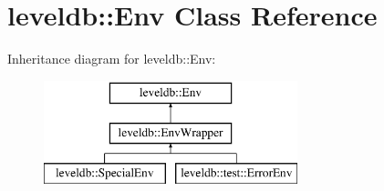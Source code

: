 \hypertarget{classleveldb_1_1_env}{}\section{leveldb\+:\+:Env Class Reference}
\label{classleveldb_1_1_env}
Inheritance diagram for leveldb\+:\+:Env\+:\begin{figure}[H]
\begin{center}
\leavevmode
\includegraphics[height=3.000000cm]{classleveldb_1_1_env}
\end{center}
\end{figure}
